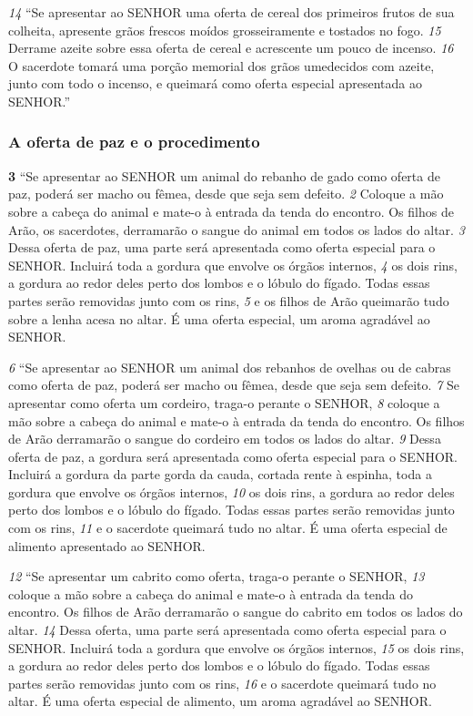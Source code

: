 \smallskip
\textit{\tiny 14}
“Se apresentar ao SENHOR uma oferta de cereal dos primeiros frutos de sua
colheita, apresente grãos frescos moídos grosseiramente e tostados no fogo.
\textit{\tiny 15}
Derrame azeite sobre essa oferta de cereal e acrescente um pouco de incenso.
\textit{\tiny 16}
O sacerdote tomará uma porção memorial dos grãos umedecidos com azeite,
junto com todo o incenso, e queimará como oferta especial apresentada ao
SENHOR.”

\bigskip
\subsubsection*{A oferta de paz e o procedimento}
\textbf{\large 3} “Se apresentar ao SENHOR um animal do rebanho de gado como oferta de paz,
poderá ser macho ou fêmea, desde que seja sem defeito. 
\textit{\tiny 2} 
Coloque a mão sobre a
cabeça do animal e mate-o à entrada da tenda do encontro. Os filhos de Arão, os
sacerdotes, derramarão o sangue do animal em todos os lados do altar. 
\textit{\tiny 3} 
Dessa
oferta de paz, uma parte será apresentada como oferta especial para o SENHOR.
Incluirá toda a gordura que envolve os órgãos internos, 
\textit{\tiny 4} 
os dois rins, a gordura ao
redor deles perto dos lombos e o lóbulo do fígado. Todas essas partes serão
removidas junto com os rins, 
\textit{\tiny 5} 
e os filhos de Arão queimarão tudo sobre a lenha
acesa no altar. É uma oferta especial, um aroma agradável ao SENHOR. 

\smallskip
\textit{\tiny 6} 
“Se apresentar ao SENHOR um animal dos rebanhos de ovelhas ou de cabras
como oferta de paz, poderá ser macho ou fêmea, desde que seja sem defeito. 
\smallskip
\textit{\tiny 7} 
Se
apresentar como oferta um cordeiro, traga-o perante o SENHOR, 
\textit{\tiny 8} 
coloque a mão
sobre a cabeça do animal e mate-o à entrada da tenda do encontro. Os filhos de
Arão derramarão o sangue do cordeiro em todos os lados do altar. 
\textit{\tiny 9} 
Dessa oferta
de paz, a gordura será apresentada como oferta especial para o SENHOR. Incluirá a
gordura da parte gorda da cauda, cortada rente à espinha, toda a gordura que
envolve os órgãos internos, 
\textit{\tiny 10}
os dois rins, a gordura ao redor deles perto dos
lombos e o lóbulo do fígado. Todas essas partes serão removidas junto com os
rins, 
\textit{\tiny 11}
e o sacerdote queimará tudo no altar. É uma oferta especial de alimento
apresentado ao SENHOR.
   
\smallskip
\textit{\tiny 12}
“Se apresentar um cabrito como oferta, traga-o perante o SENHOR, 
\textit{\tiny 13}
coloque a
mão sobre a cabeça do animal e mate-o à entrada da tenda do encontro. Os filhos
de Arão derramarão o sangue do cabrito em todos os lados do altar. 
\textit{\tiny 14}
Dessa
oferta, uma parte será apresentada como oferta especial para o SENHOR. Incluirá
toda a gordura que envolve os órgãos internos, 
\textit{\tiny 15}
os dois rins, a gordura ao redor
deles perto dos lombos e o lóbulo do fígado. Todas essas partes serão removidas
junto com os rins, 
\textit{\tiny 16}
e o sacerdote queimará tudo no altar. É uma oferta especial
de alimento, um aroma agradável ao SENHOR. 

